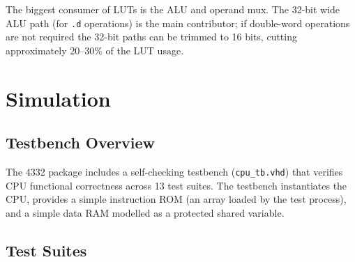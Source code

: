 \documentclass[a4paper,12pt]{report}
\newcommand{\asm}[1]{\texttt{#1}}
\begin{document}
The biggest consumer of LUTs is the ALU and operand mux. The 32-bit wide ALU path (for \asm{.d} operations) is the main contributor; if double-word operations are not required the 32-bit paths can be trimmed to 16 bits, cutting approximately 20--30\% of the LUT usage.

\chapter{Simulation}
\label{ch:simulation}

\section{Testbench Overview}

The 4332 package includes a self-checking testbench (\texttt{cpu\_tb.vhd}) that verifies CPU functional correctness across 13 test suites. The testbench instantiates the CPU, provides a simple instruction ROM (an array loaded by the test process), and a simple data RAM modelled as a protected shared variable.

\section{Test Suites}
\end{document}
